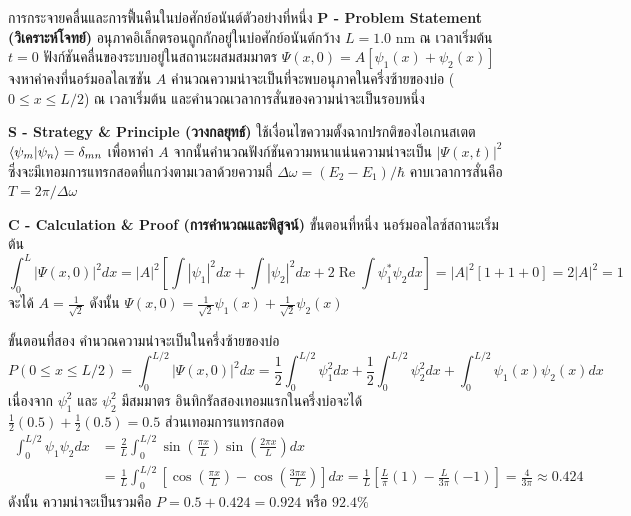 \begin{psctbox}{การกระจายคลื่นและการฟื้นคืนในบ่อศักย์อนันต์}{ตัวอย่างที่หนึ่ง}
\noindent\textbf{P - Problem Statement (วิเคราะห์โจทย์)} อนุภาคอิเล็กตรอนถูกกักอยู่ในบ่อศักย์อนันต์กว้าง $L = 1.0\text{ nm}$ ณ เวลาเริ่มต้น $t = 0$ ฟังก์ชันคลื่นของระบบอยู่ในสถานะผสมสมมาตร $\Psi(x, 0) = A \left[ \psi_1(x) + \psi_2(x) \right]$ จงหาค่าคงที่นอร์มอลไลเซชัน $A$ คำนวณความน่าจะเป็นที่จะพบอนุภาคในครึ่งซ้ายของบ่อ ($0 \le x \le L/2$) ณ เวลาเริ่มต้น และคำนวณเวลาการสั่นของความน่าจะเป็นรอบหนึ่ง

\vspace{6pt}
\noindent\textbf{S - Strategy \& Principle (วางกลยุทธ์)} ใช้เงื่อนไขความตั้งฉากปรกติของไอเกนสเตต $\braket{\psi_m}{\psi_n} = \delta_{mn}$ เพื่อหาค่า $A$ จากนั้นคำนวณฟังก์ชันความหนาแน่นความน่าจะเป็น $|\Psi(x, t)|^2$ ซึ่งจะมีเทอมการแทรกสอดที่แกว่งตามเวลาด้วยความถี่ $\Delta\omega = (E_2 - E_1)/\hbar$ คาบเวลาการสั่นคือ $T = 2\pi/\Delta\omega$

\vspace{6pt}
\noindent\textbf{C - Calculation \& Proof (การคำนวณและพิสูจน์)}
ขั้นตอนที่หนึ่ง นอร์มอลไลซ์สถานะเริ่มต้น
\begin{equation}
\int_0^L |\Psi(x, 0)|^2 dx = |A|^2 \left[ \int |\psi_1|^2 dx + \int |\psi_2|^2 dx + 2 \operatorname{Re}\int \psi_1^* \psi_2 dx \right] = |A|^2 [1 + 1 + 0] = 2|A|^2 = 1
\end{equation}
จะได้ $A = \frac{1}{\sqrt{2}}$ ดังนั้น $\Psi(x, 0) = \frac{1}{\sqrt{2}} \psi_1(x) + \frac{1}{\sqrt{2}} \psi_2(x)$

ขั้นตอนที่สอง คำนวณความน่าจะเป็นในครึ่งซ้ายของบ่อ
\begin{equation}
P(0 \le x \le L/2) = \int_0^{L/2} |\Psi(x, 0)|^2 dx = \frac{1}{2}\int_0^{L/2} \psi_1^2 dx + \frac{1}{2}\int_0^{L/2} \psi_2^2 dx + \int_0^{L/2} \psi_1(x)\psi_2(x) dx
\end{equation}
เนื่องจาก $\psi_1^2$ และ $\psi_2^2$ มีสมมาตร อินทิกรัลสองเทอมแรกในครึ่งบ่อจะได้ $\frac{1}{2}(0.5) + \frac{1}{2}(0.5) = 0.5$ ส่วนเทอมการแทรกสอด
\begin{align}
\int_0^{L/2} \psi_1 \psi_2 dx &= \frac{2}{L} \int_0^{L/2} \sin\left(\frac{\pi x}{L}\right) \sin\left(\frac{2\pi x}{L}\right) dx \\
&= \frac{1}{L} \int_0^{L/2} \left[ \cos\left(\frac{\pi x}{L}\right) - \cos\left(\frac{3\pi x}{L}\right) \right] dx = \frac{1}{L} \left[ \frac{L}{\pi} (1) - \frac{L}{3\pi} (-1) \right] = \frac{4}{3\pi} \approx 0.424
\end{align}
ดังนั้น ความน่าจะเป็นรวมคือ $P = 0.5 + 0.424 = 0.924$ หรือ $92.4\%$


\end{psctbox}
